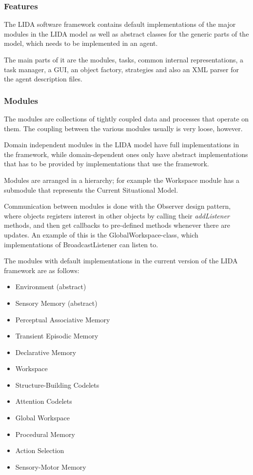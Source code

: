 \subsubsection{Features}
The LIDA software framework contains default implementations of the major modules in the LIDA model as well as abstract classes for the generic parts of the model, which needs to be implemented in an agent.

The main parts of it are the modules, tasks, common internal representations, a task manager, a GUI, an object factory, strategies and also an XML parser for the agent description files.\cite{snaider2012lida}

\subsubsection{Modules}
The modules are collections of tightly coupled data and processes that operate on them. The coupling between the various modules usually is very loose, however.

Domain independent modules in the LIDA model have full implementations in the framework, while domain-dependent ones only have abstract implementations that has to be provided by implementations that use the framework.

Modules are arranged in a hierarchy; for example the Workspace module has a submodule that represents the Current Situational Model. 

Communication between modules is done with the Observer design pattern, where objects registers interest in other objects by calling their {\em addListener} methods, and then get callbacks to pre-defined methods whenever there are updates. An example of this is the GlobalWorkspace-class, which implementations of BroadcastListener can listen to.

The modules with default implementations in the current version of the LIDA framework are as follows:\cite{snaider2012lida}
\begin{itemize}
 \item Environment (abstract)
 \item Sensory Memory (abstract)
 \item Perceptual Associative Memory
 \item Transient Episodic Memory
 \item Declarative Memory
 \item Workspace
 \item Structure-Building Codelets
 \item Attention Codelets
 \item Global Workspace
 \item Procedural Memory
 \item Action Selection
 \item Sensory-Motor Memory
\end{itemize}

